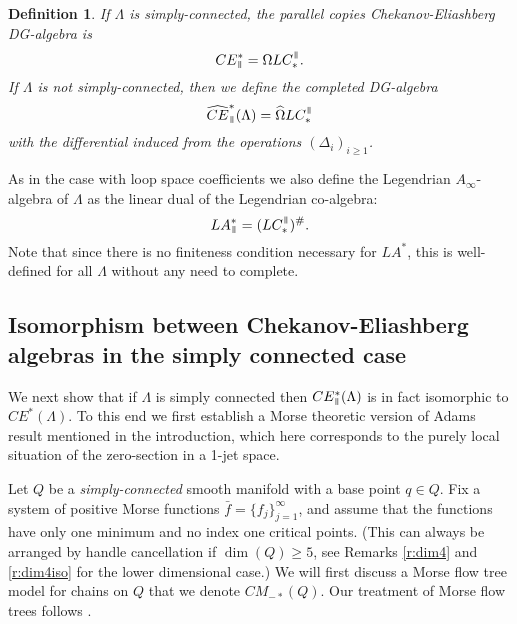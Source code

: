 \documentclass{gtpart}
\newtheorem{defi}[thm]{Definition}
\renewcommand{\parallel}{{\mkern3mu\vphantom{\perp}\vrule depth 0pt\mkern2mu\vrule depth
0pt\mkern3mu}}
\begin{document}
\begin{defi}
If $\Lambda$ is simply-connected, the parallel copies Chekanov-Eliashberg DG-algebra is 
\[ 
CE^{\ast}_{\parallel} = \Omega LC_{\ast}^{\parallel}.
\]     
If $\Lambda$ is not simply-connected, then we define the completed DG-algebra
    \[ \widehat{CE}^{\ast}_{\parallel}(\Lambda) = \widehat{\Omega} LC^{\parallel}_{*} \] 
with the differential induced from the operations $(\Delta_i)_{i \geq 1}$.
\end{defi}

As in the case with loop space coefficients we also define the Legendrian $A_{\infty}$-algebra of $\Lambda$ as the linear dual of the Legendrian co-algebra:
\[ 
LA^{\ast}_{\parallel}=(LC_{\ast}^{\parallel})^{\#}.
\]
Note that since there is no finiteness condition necessary for $LA^{\ast}$, this is well-defined for
all $\Lambda$ without any need to complete. 

\subsection{Isomorphism between Chekanov-Eliashberg algebras in the simply connected case} 
\label{CEsimplyconnected}

We next show that if $\Lambda$ is simply connected then $CE^{\ast}_{\parallel}(\Lambda)$ is in fact isomorphic to $CE^{\ast}(\Lambda)$. To this end we first establish a Morse theoretic version of Adams result mentioned in the introduction, which here corresponds to the purely local situation of the zero-section in a 1-jet space.

Let $Q$ be a \emph{simply-connected} smooth manifold with a base point $q\in Q$. Fix a system of positive Morse functions
$\bar f=\{f_{j}\}_{j=1}^{\infty}$,  and assume that the functions have only one minimum and no index
one critical points. (This can always be arranged by handle cancellation if $\dim(Q)\ge 5$, see Remarks \ref{r:dim4} and \ref{r:dim4iso} for the lower dimensional case.) We will first discuss a Morse flow tree model for chains on $Q$ that we denote
$CM_{-\ast}(Q)$. Our treatment of Morse flow trees follows \cite{E}. 
\end{document}
